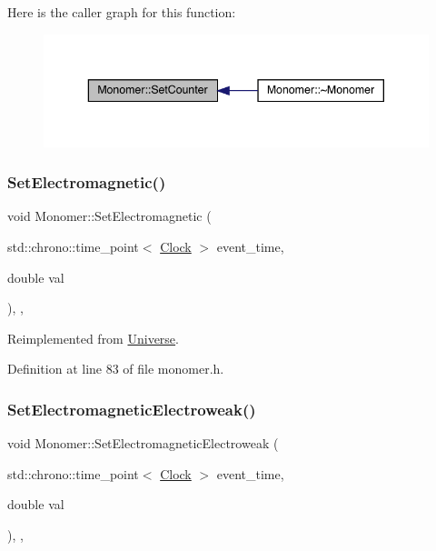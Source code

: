 Here is the caller graph for this function\+:
\nopagebreak
\begin{figure}[H]
\begin{center}
\leavevmode
\includegraphics[width=343pt]{class_monomer_a6f0dfa4382b3d4fa19b7ee0fb8fe7a55_icgraph}
\end{center}
\end{figure}
\mbox{\label{class_monomer_a50e41be601b31450a97bfd15950cfb3d}} 
\subsubsection{\texorpdfstring{Set\+Electromagnetic()}{SetElectromagnetic()}}
{\footnotesize\ttfamily void Monomer\+::\+Set\+Electromagnetic (\begin{DoxyParamCaption}\item[{std\+::chrono\+::time\+\_\+point$<$ \hyperlink{universe_8h_a0ef8d951d1ca5ab3cfaf7ab4c7a6fd80}{Clock} $>$}]{event\+\_\+time,  }\item[{double}]{val }\end{DoxyParamCaption})\hspace{0.3cm}{\ttfamily [inline]}, {\ttfamily [final]}, {\ttfamily [virtual]}}



Reimplemented from \hyperlink{class_universe_aa981fc7e252b1fbbb675f0371860954d}{Universe}.



Definition at line 83 of file monomer.\+h.

\mbox{\label{class_monomer_aa034728b74053ed3df452ddc8f1b46e8}} 
\subsubsection{\texorpdfstring{Set\+Electromagnetic\+Electroweak()}{SetElectromagneticElectroweak()}}
{\footnotesize\ttfamily void Monomer\+::\+Set\+Electromagnetic\+Electroweak (\begin{DoxyParamCaption}\item[{std\+::chrono\+::time\+\_\+point$<$ \hyperlink{universe_8h_a0ef8d951d1ca5ab3cfaf7ab4c7a6fd80}{Clock} $>$}]{event\+\_\+time,  }\item[{double}]{val }\end{DoxyParamCaption})\hspace{0.3cm}{\ttfamily [inline]}, {\ttfamily [final]}, {\ttfamily [virtual]}}




